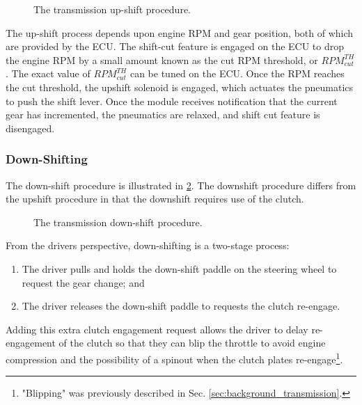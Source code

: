 \begin{figure}[H]
	\centering
	
	\caption{The transmission up-shift procedure.}
	\label{fig:transmission_upshift_flow}
\end{figure}

The up-shift process depends upon engine RPM and gear position, both of which are provided by the ECU. The shift-cut feature is engaged on the ECU to drop the engine RPM by a small amount known as the cut RPM threshold, or $RPM^{TH}_{cut}$. The exact value of $RPM^{TH}_{cut}$ can be tuned on the ECU. Once the RPM reaches the cut threshold, the upshift solenoid is engaged, which actuates the pneumatics to push the shift lever. Once the module receives notification that the current gear has incremented, the pneumatics are relaxed, and shift cut feature is disengaged.


\subsubsection{Down-Shifting}

The down-shift procedure is illustrated in \ref{fig:transmission_downshift_flow}. The downshift procedure differs from the upshift procedure in that the downshift requires use of the clutch. 

\begin{figure}[H]
	\centering
	
	\caption{The transmission down-shift procedure.}
	\label{fig:transmission_downshift_flow}
\end{figure}

From the drivers perspective, down-shifting is a two-stage process:

\begin{enumerate}
  \item The driver pulls and holds the down-shift paddle on the steering wheel to request the gear change; and
  \item The driver releases the down-shift paddle to requests the clutch re-engage.
\end{enumerate}

Adding this extra clutch engagement request allows the driver to delay re-engagement of the clutch so that they can blip the throttle to avoid engine compression and the possibility of a spinout when the clutch plates re-engage\footnote{"Blipping" was previously described in Sec. \ref{sec:background_transmission}.}. 

